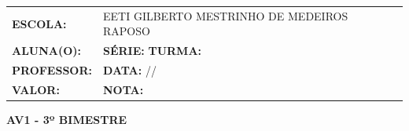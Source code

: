 \documentclass[12pt]{article}
\begin{document}
	\large
	\thispagestyle{empty}
	\vspace{0.5cm}
	\begin{center}
		\large
		\begin{tabular}{|l l|}
			\hline
			\textbf{ESCOLA:} & EETI GILBERTO MESTRINHO DE MEDEIROS RAPOSO \\ 
			\textbf{ALUNA(O):} & \underline{\hspace{7cm}} \textbf{SÉRIE:} \underline{\hspace{1.5cm}} \textbf{TURMA:} \underline{\hspace{1.5cm}} \\
			\textbf{PROFESSOR:} & \underline{\hspace{7cm}} \textbf{DATA:} \underline{\hspace{1.5cm}}/\underline{\hspace{1.5cm}}/\underline{\hspace{1.5cm}} \\
			\textbf{VALOR:} & \underline{\hspace{3cm}} \textbf{NOTA:} \underline{\hspace{1.5cm}} \\
			\hline
		\end{tabular}
	\end{center}
	\vspace{0.5cm}
	
	\begin{center}
		\Large\textbf{AV1 - 3º BIMESTRE}
	\end{center}
	
	\vspace{0.3cm}
	
\end{document}
